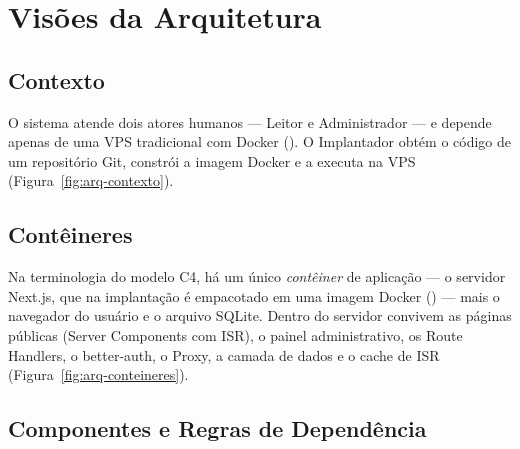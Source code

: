 \section{Visões da Arquitetura}\label{sec:arq-visoes}

\subsection{Contexto}

O sistema atende dois atores humanos --- Leitor e Administrador --- e depende apenas de uma VPS tradicional com Docker (). O Implantador obtém o código de um repositório Git, constrói a imagem Docker e a executa na VPS (Figura~\ref{fig:arq-contexto}).


\subsection{Contêineres}

Na terminologia do modelo C4, há um único \emph{contêiner} de aplicação --- o servidor Next.js, que na implantação é empacotado em uma imagem Docker () --- mais o navegador do usuário e o arquivo SQLite. Dentro do servidor convivem as páginas públicas (Server Components com ISR), o painel administrativo, os Route Handlers, o better-auth, o Proxy, a camada de dados e o cache de ISR (Figura~\ref{fig:arq-conteineres}).


\subsection{Componentes e Regras de Dependência}

